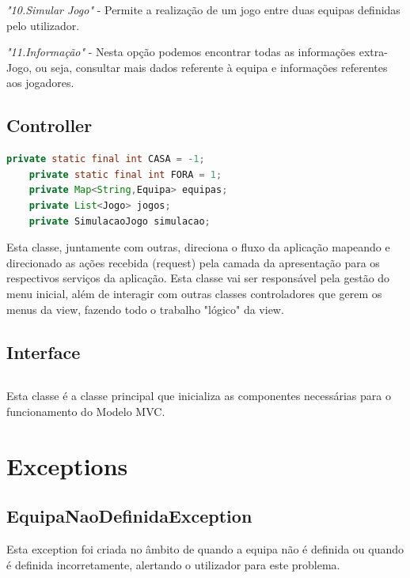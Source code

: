 \documentclass[a4paper]{report}
\begin{document}
                    \textit{"10.Simular Jogo"} - Permite a realização de um jogo entre duas equipas definidas pelo utilizador.
                    
                    \textit{"11.Informação"} - Nesta opção podemos encontrar todas as informações extra-Jogo, ou seja, consultar mais dados referente à equipa e informações referentes aos jogadores.
                    
                    
	\newpage
	
	\section{Controller}
	\begin{lstlisting}[language=Java]
    private static final int CASA = -1;
    private static final int FORA = 1;
    private Map<String,Equipa> equipas;
    private List<Jogo> jogos;
    private SimulacaoJogo simulacao;
	\end{lstlisting}
	
	Esta classe, juntamente com outras, direciona o fluxo da aplicação mapeando e direcionado as ações recebida (request) pela camada da apresentação para os respectivos serviços da aplicação. Esta classe vai ser responsável pela gestão do menu inicial, além de interagir com outras classes controladores que gerem os menus da view, fazendo todo o trabalho "lógico" da view.	
	
	\section{Interface}
	\begin{lstlisting}[language=Java]
	\end{lstlisting}
	
	Esta classe é a classe principal que inicializa as componentes necessárias para o funcionamento do Modelo MVC.
	
	
	
	
	\chapter{Exceptions}
	
    \section{EquipaNaoDefinidaException}
	
    Esta exception foi criada no âmbito de quando a equipa não é definida ou quando é definida incorretamente, alertando o utilizador para este problema.
    
\end{document}
